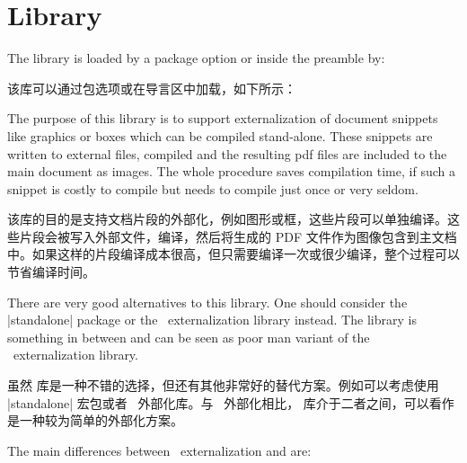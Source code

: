 \section{Library }\label{sec:external}%
%
The library is loaded by a package option or inside the preamble by:

该库可以通过包选项或在导言区中加载，如下所示：
\begin{dispListing}
\end{dispListing}

The purpose of this library is to support externalization of document
snippets like graphics or boxes which can be compiled stand-alone.
These snippets are written to external files, compiled and the resulting
pdf files are included to the main document as images.
The whole procedure saves compilation time, if such a snippet is costly to
compile but needs to compile just once or very seldom.

该库的目的是支持文档片段的外部化，例如图形或框，这些片段可以单独编译。这些片段会被写入外部文件，编译，然后将生成的 PDF 文件作为图像包含到主文档中。如果这样的片段编译成本很高，但只需要编译一次或很少编译，整个过程可以节省编译时间。

There are very good alternatives to this library. One should consider
the |standalone| package or the \tikzname\ externalization library instead.
The  library is something in between and can be seen as
poor man variant of the \tikzname\ externalization library.

虽然  库是一种不错的选择，但还有其他非常好的替代方案。例如可以考虑使用 |standalone| 宏包或者 \tikzname\ 外部化库。与 \tikzname\ 外部化相比， 库介于二者之间，可以看作是一种较为简单的外部化方案。


The main differences between \tikzname\ externalization and  are:

